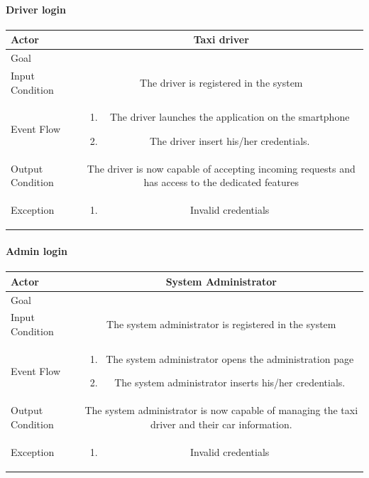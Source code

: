 \documentclass[a4paper,12pt,dvipsnames]{article}%
\newcommand{\usecasetable}[6]{
\begin{center}
\def\arraystretch{1.5}
\begin{tabularx}{\textwidth}{|s|C|}
\hline
Actor & #1\\
\hline
Goal & #2\\
\hline
Input Condition & #3 \\
\hline
Event Flow & #4\\
\hline
Output Condition & #5\\
\hline
Exception & #6\\
\hline
\end{tabularx}
\end{center}
}
\begin{document}
\paragraph{Driver login}
\usecasetable{Taxi driver}{}{The driver is registered in the system}
{
\begin{minipage}[b]{11cm}
\begin{enumerate}
\item The driver launches the application on the smartphone
\item The driver insert his/her credentials.
\end{enumerate}
\end{minipage}
}
{The driver is now capable of accepting incoming requests and has access to the dedicated features}
{
\begin{minipage}[b]{11cm}
\begin{enumerate}
\item Invalid credentials
\end{enumerate}
\end{minipage}
}
\break
\paragraph{Admin login}
\usecasetable{System Administrator}{}{The system administrator is registered in the system}
{
\begin{minipage}[b]{11cm}
\begin{enumerate}
\item The system administrator opens the administration page
\item The system administrator inserts his/her credentials.
\end{enumerate}
\end{minipage}
}
{The system administrator is now capable of managing the taxi driver and their car information.}
{
\begin{minipage}[b]{11cm}
\begin{enumerate}
\item Invalid credentials
\end{enumerate}
\end{minipage}
}
\break
\end{document}
